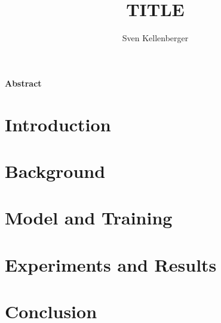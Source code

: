 \documentclass[a4paper]{report}
\begin{document}
\pagestyle{fancyplain} \thispagestyle{empty}

\title{TITLE}
\author{Sven Kellenberger}

 \setcounter{page}{1}
\maketitle

\newpage
\thispagestyle{empty}
\vspace{8cm}
\noindent
{\centerline {\bf \large Abstract}}
\vspace{1cm}


\noindent



 \setcounter{page}{1}
\tableofcontents
\newpage{\pagestyle{empty} \cleardoublepage}

 \setcounter{page}{1}
\pagestyle{fancy}

\chapter{Introduction}

\newpage{\pagestyle{empty} \cleardoublepage}

\chapter{Background}

\newpage{\pagestyle{empty} \cleardoublepage}

\chapter{Model and Training}

\newpage{\pagestyle{empty} \cleardoublepage}

\chapter{Experiments and Results}

\newpage{\pagestyle{empty} \cleardoublepage}

\chapter{Conclusion}

\newpage{\pagestyle{empty} \cleardoublepage}
\end{document}
